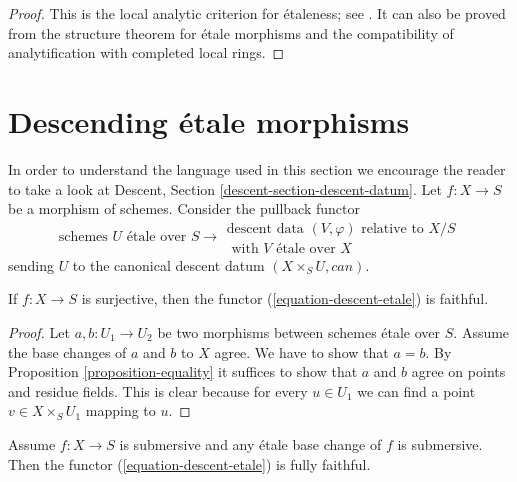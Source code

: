 \begin{proof}
This is the local analytic criterion for \'etaleness; see
\cite[Expos\'e XII]{SGA1}. It can also be proved from the structure theorem
for \'etale morphisms and the compatibility of analytification with completed
local rings.
\end{proof}








\section{Descending \'etale morphisms}
\label{section-descending-etale}

\noindent
In order to understand the language used in this section we encourage
the reader to take a look at
Descent, Section \ref{descent-section-descent-datum}.
Let $f : X \to S$ be a morphism of schemes. Consider the
pullback functor
\begin{equation}
\label{equation-descent-etale}
\text{schemes }U\text{ \'etale over }S \longrightarrow
\begin{matrix}
\text{descent data }(V, \varphi)\text{ relative to }X/S \\
\text{ with }V\text{ \'etale over }X
\end{matrix}
\end{equation}
sending $U$ to the canonical descent datum $(X \times_S U, can)$.

\begin{lemma}
\label{lemma-faithful}
If $f : X \to S$ is surjective, then the functor
(\ref{equation-descent-etale}) is faithful.
\end{lemma}

\begin{proof}
Let $a, b : U_1 \to U_2$ be two morphisms between schemes \'etale over $S$.
Assume the base changes of $a$ and $b$ to $X$ agree.
We have to show that $a = b$.
By Proposition \ref{proposition-equality} it suffices to
show that $a$ and $b$ agree on points and residue fields.
This is clear because for every $u \in U_1$ we can find a point
$v \in X \times_S U_1$ mapping to $u$.
\end{proof}

\begin{lemma}
\label{lemma-fully-faithful}
Assume $f : X \to S$ is submersive and any \'etale base change
of $f$ is submersive. Then the functor
(\ref{equation-descent-etale}) is fully faithful.
\end{lemma}

